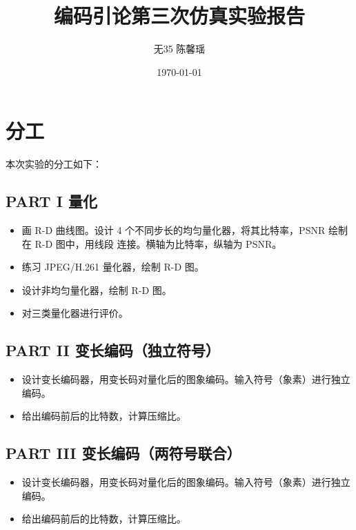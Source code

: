 \documentclass[UTF8]{ctexart}
\title{编码引论第三次仿真实验报告}
\author{无35 \quad 陈馨瑶 \quad 2013011166}
\date{\today}
\begin{document}
\maketitle


\setlength{\headheight}{13pt}



\section{分工}

本次实验的分工如下：

\subsection{PART I 量化}

\begin{itemize}
    \item 画 R-D 曲线图。设计 4 个不同步长的均匀量化器，将其比特率，PSNR 绘制在 R-D 图中，用线段
连接。横轴为比特率，纵轴为 PSNR。
    \item 练习 JPEG/H.261 量化器，绘制 R-D 图。
    \item 设计非均匀量化器，绘制 R-D 图。
    \item 对三类量化器进行评价。
\end{itemize}

\subsection{PART II 变长编码（独立符号）}

\begin{itemize}
    \item 设计变长编码器，用变长码对量化后的图象编码。输入符号（象素）进行独立编码。
    \item 给出编码前后的比特数，计算压缩比。
\end{itemize}

\subsection{PART III 变长编码（两符号联合）}

\begin{itemize}
    \item 设计变长编码器，用变长码对量化后的图象编码。输入符号（象素）进行独立编码。
    \item 给出编码前后的比特数，计算压缩比。
\end{itemize}
\end{document}
